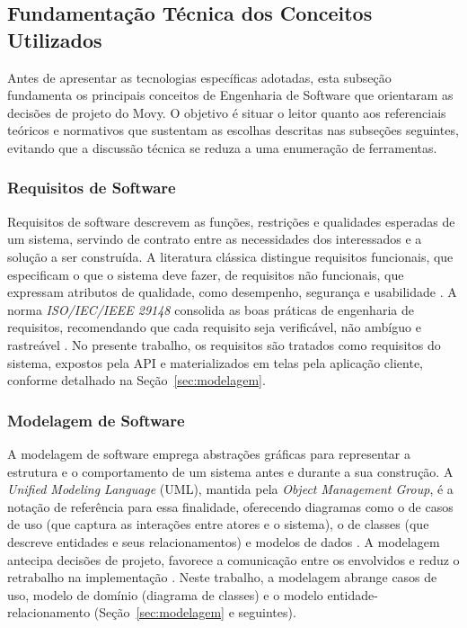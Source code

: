 \subsection{Fundamentação Técnica dos Conceitos Utilizados}
\label{sec:fundamentacao}

Antes de apresentar as tecnologias específicas adotadas, esta subseção
fundamenta os principais conceitos de Engenharia de Software que orientaram
as decisões de projeto do Movy. O objetivo é situar o leitor quanto aos
referenciais teóricos e normativos que sustentam as escolhas descritas nas
subseções seguintes, evitando que a discussão técnica se reduza a uma
enumeração de ferramentas.

\subsubsection{Requisitos de Software}

Requisitos de software descrevem as funções, restrições e qualidades
esperadas de um sistema, servindo de contrato entre as necessidades dos
interessados e a solução a ser construída. A literatura clássica distingue
requisitos funcionais, que especificam o que o sistema deve fazer,
de requisitos não funcionais, que expressam atributos de
qualidade, como desempenho, segurança e usabilidade \cite{sommerville2011,
pressman2016}. A norma \textit{ISO/IEC/IEEE 29148} consolida as boas práticas
de engenharia de requisitos, recomendando que cada requisito seja verificável,
não ambíguo e rastreável \cite{ieee29148}. No presente trabalho, os requisitos
são tratados como requisitos do sistema, expostos pela API e
materializados em telas pela aplicação cliente, conforme detalhado na
Seção~\ref{sec:modelagem}.

\subsubsection{Modelagem de Software}

A modelagem de software emprega abstrações gráficas para representar a
estrutura e o comportamento de um sistema antes e durante a sua construção.
A \textit{Unified Modeling Language} (UML), mantida pela \textit{Object
Management Group}, é a notação de referência para essa finalidade, oferecendo
diagramas como o de casos de uso (que captura as interações entre
atores e o sistema), o de classes (que descreve entidades e seus
relacionamentos) e modelos de dados \cite{omguml}. A modelagem antecipa
decisões de projeto, favorece a comunicação entre os envolvidos e reduz o
retrabalho na implementação \cite{sommerville2011}. Neste trabalho, a
modelagem abrange casos de uso, modelo de domínio (diagrama de classes) e o
modelo entidade-relacionamento (Seção~\ref{sec:modelagem} e seguintes).

